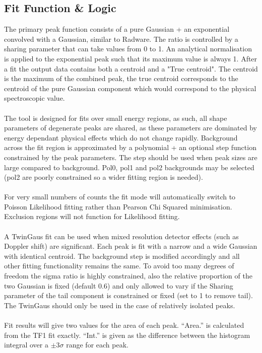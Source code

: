 \documentclass[a4paper,10pt]{article}
\begin{document}
\subsection{Fit Function \& Logic}
The primary peak function consists of a pure Gaussian + an exponential convolved with a Gaussian, similar to Radware. The ratio is controlled by a sharing parameter that can take values from 0 to 1. An analytical normalisation is applied to the exponential peak such that its maximum value is always 1. After a fit the output data contains both a centroid and a "True centroid". The centroid is the maximum of the combined peak, the true centroid corresponds to the centroid of the pure Gaussian component which would correspond to the physical spectroscopic value.  
\\
\\
The tool is designed for fits over small energy regions, as such, all shape parameters of degenerate peaks are shared, as these parameters are dominated by energy dependant physical effects which do not change rapidly. Background across the fit region is approximated by a polynomial + an optional step function constrained by the peak parameters. The step should be used when peak sizes are large compared to background. Pol0, pol1 and pol2 backgrounds may be selected (pol2 are poorly constrained so a wider fitting region is needed).
\\
\\
For very small numbers of counts the fit mode will automatically switch to Poisson Likelihood fitting rather than Pearson Chi Squared minimisation. Exclusion regions will not function for Likelihood fitting.
\\
\\
A TwinGaus fit can be used when mixed resolution detector effects (such as Doppler shift) are significant. Each peak is fit with a narrow and a wide Gaussian with identical centroid. The background step is modified accordingly and all other fitting functionality remains the same. To avoid too many degrees of freedom the sigma ratio is highly constrained, also the relative proportion of the two Gaussian is fixed (default 0.6) and only allowed to vary if the Sharing parameter of the tail component is constrained or fixed (set to 1 to remove tail). The TwinGaus should only be used in the case of relatively isolated peaks.
\\
\\
Fit results will give two values for the area of each peak.
``Area.'' is calculated from the TF1 fit exactly.
``Int.'' is given as the difference between the histogram integral over a $\pm3\sigma$ range for each peak.
\end{document}
